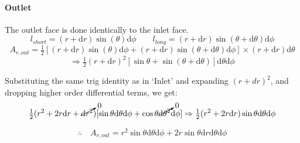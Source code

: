 \documentclass[12pt, letterpaper, twoside]{article}
\begin{document}
        \paragraph{Outlet}
            The outlet face is done identically to the inlet face.
            \begin{equation*}
                l_{short} = (r + \textrm{d}r)\sin(\theta) \textrm{d}\phi  \qquad
                l_{long} = (r + \textrm{d}r)\sin(\theta + \textrm{d}\theta) \textrm{d}\phi
            \end{equation*}
            \begin{equation}
                A_{r,out} = \tfrac{1}{2} [(r + \textrm{d}r)\sin(\theta) \textrm{d}\phi + (r + \textrm{d}r)\sin(\theta + \textrm{d}\theta) \textrm{d}\phi] \times (r + \textrm{d}r)\textrm{d}\theta
                \label{eq:Arout_init}
            \end{equation}
            \begin{equation*}
                \Rightarrow
                \tfrac{1}{2} (r + \textrm{d}r)^2 [ \sin\theta + \sin (\theta + \textrm{d}\theta)] \textrm{d}\theta \textrm{d}\phi
            \end{equation*}

            Substituting the same trig identity as in `Inlet' and expanding \((r + dr)^2\), and dropping higher order differential terms, we get:
            \begin{equation*}
                \tfrac{1}{2} (r^2 + 2r\textrm{d}r + \cancelto{0}{\textrm{d}r^2}) [\sin\theta \textrm{d}\theta \textrm{d}\phi + \cos\theta \cancelto{0}{\textrm{d}\theta^2} \textrm{d}\phi]
                \Rightarrow \tfrac{1}{2} (r^2 + 2r\textrm{d}r) \sin\theta \textrm{d}\theta \textrm{d}\phi
            \end{equation*}

            \begin{equation}
                \therefore\quad A_{r,out} = r^2 \sin\theta \textrm{d}\theta \textrm{d}\phi + 
                2r\sin\theta \textrm{d}r\textrm{d}\theta \textrm{d}\phi
                \label{eq:Arout_final}
            \end{equation}
\end{document}
